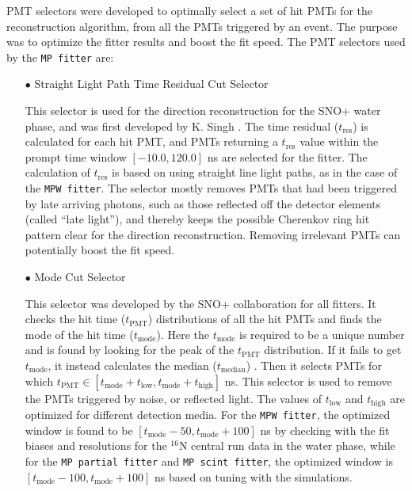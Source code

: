PMT selectors were developed to optimally select a set of hit PMTs for the reconstruction algorithm, from all the PMTs triggered by an event. The purpose was to optimize the fitter results and boost the fit speed. The PMT selectors used by the \texttt{MP fitter} are:

\begin{itemize}
	\item[$\bullet$] Straight Light Path Time Residual Cut Selector
	
	This selector is used for the direction reconstruction for the SNO+ water phase, and was first developed by K. Singh \cite{kalpanaMPFitter}. The time residual ($t_\mathrm{res}$) is calculated for each hit PMT, and PMTs returning a $t_\mathrm{res}$ value within the prompt time window $[-10.0, 120.0]$ ns are selected for the fitter. The calculation of $t_\mathrm{res}$ is based on using straight line light paths, as in the case of the \texttt{MPW fitter}. The selector mostly removes PMTs that had been triggered by late arriving photons, such as those reflected off the detector elements (called ``late light''), and thereby keeps the possible Cherenkov ring hit pattern clear for the direction reconstruction. Removing irrelevant PMTs can potentially boost the fit speed.
	
	\item[$\bullet$] Mode Cut Selector
	
	This selector was developed by the SNO+ collaboration for all fitters. It checks the hit time ($t_\mathrm{PMT}$) distributions of all the hit PMTs and finds the mode of the hit time ($t_\mathrm{mode}$). Here the $t_\mathrm{mode}$ is required to be a unique number and is found by looking for the peak of the $t_\mathrm{PMT}$ distribution. If it fails to get $t_\mathrm{mode}$, it instead calculates the median ($t_\mathrm{median}$) \cite{modeCut}. Then it selects PMTs for which $t_\mathrm{PMT} \in [t_\mathrm{mode}+t_\mathrm{low}, t_\mathrm{mode}+t_\mathrm{high}]$ ns. This selector is used to remove the PMTs triggered by noise, or reflected light. The values of $t_\mathrm{low}$ and $t_\mathrm{high}$ are optimized for different detection media. For the \texttt{MPW fitter}, the optimized window is found to be $[t_\mathrm{mode}-50, t_\mathrm{mode}+100]$ ns by checking with the fit biases and resolutions for the $^{16}$N central run data in the water phase, while for the \texttt{MP partial fitter} and \texttt{MP scint fitter}, the optimized window is $[t_\mathrm{mode}-100, t_\mathrm{mode}+100]$ ns based on tuning with the simulations.
	

\end{itemize}
